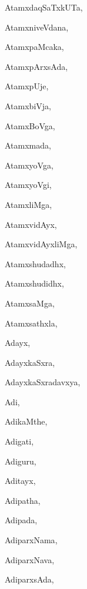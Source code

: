 \begin{multicols}{3}
{\noindent
{AtamxdaqSaTxkUTa}, \pageref{AtamxdaqSaTxkUTa}

\noindent
{AtamxniveVdana}, \pageref{AtamxniveVdana}

\noindent
{AtamxpaMcaka}, \pageref{AtamxpaMcaka}

\noindent
{AtamxpArxsAda}, \pageref{AtamxpArxsAda}

\noindent
{AtamxpUje}, \pageref{AtamxpUje}

\noindent
{AtamxbiVja}, \pageref{AtamxbiVja}

\noindent
{AtamxBoVga}, \pageref{AtamxBoVga}

\noindent
{Atamxmada}, \pageref{Atamxmada}

\noindent
{AtamxyoVga}, \pageref{AtamxyoVga}

\noindent
{AtamxyoVgi}, \pageref{AtamxyoVgi}

\noindent
{AtamxliMga}, \pageref{AtamxliMga}

\noindent
{AtamxvidAyx}, \pageref{AtamxvidAyx}

\noindent
{AtamxvidAyxliMga}, \pageref{AtamxvidAyxliMga}

\noindent
{Atamxshudadhx}, \pageref{Atamxshudadhx}

\noindent
{Atamxshudidhx}, \pageref{Atamxshudidhx}

\noindent
{AtamxsaMga}, \pageref{AtamxsaMga}

\noindent
{Atamxsathxla}, \pageref{Atamxsathxla}

\noindent
{Adayx}, \pageref{Adayx}

\noindent
{AdayxkaSxra}, \pageref{AdayxkaSxra}

\noindent
{AdayxkaSxradavxya}, \pageref{AdayxkaSxradavxya}

\noindent
{Adi}, \pageref{Adi}

\noindent
{AdikaMthe}, \pageref{AdikaMthe}

\noindent
{Adigati}, \pageref{Adigati}

\noindent
{Adiguru}, \pageref{Adiguru}

\noindent
{Aditayx}, \pageref{Aditayx}

\noindent
{Adipatha}, \pageref{Adipatha}

\noindent
{Adipada}, \pageref{Adipada}

\noindent
{AdiparxNama}, \pageref{AdiparxNama}

\noindent
{AdiparxNava}, \pageref{AdiparxNava}

\noindent
{AdiparxsAda}, \pageref{AdiparxsAda}

}
\end{multicols}
